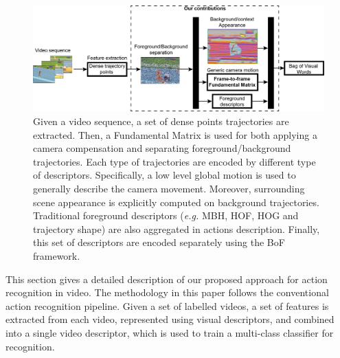 \documentclass[runningheads]{llncs}
\begin{document}
\begin{figure}[t!]
\begin{center}
\includegraphics[width=0.98\linewidth]{pipeline.png}
\end{center}
\caption{Given a video sequence, a set of dense points trajectories are extracted. Then, a Fundamental Matrix is used for both applying a camera compensation and separating foreground/background trajectories. Each type of trajectories are encoded by different type of descriptors. Specifically, a low level global motion is used to generally describe the camera movement. Moreover, surrounding scene appearance is explicitly computed on background trajectories. Traditional foreground descriptors (\emph{e.g.} MBH, HOF, HOG and trajectory shape) are also aggregated in actions description. Finally, this set of descriptors are encoded separately using the BoF framework.}
\label{fig:pipeline}
\end{figure}

This section gives a detailed description of our proposed approach for action recognition in video. The methodology in this paper follows the conventional action recognition pipeline. Given a set of labelled videos, a set of features is extracted from each video, represented using visual descriptors, and combined into a single video descriptor, which is used to train a multi-class classifier for recognition.
\end{document}
